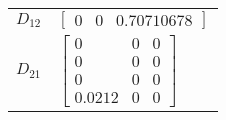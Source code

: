 \begin{tabular}{cl}
 $D_{12}$ & $\left[\begin{matrix}0 & 0 & 0.70710678\end{matrix}\right]$                                                                                                                \\
 $D_{21}$ & $\left[\begin{matrix}0 & 0 & 0\\0 & 0 & 0\\0 & 0 & 0\\0.0212 & 0 & 0\end{matrix}\right]$                                                                                   \\
\hline
\end{tabular}